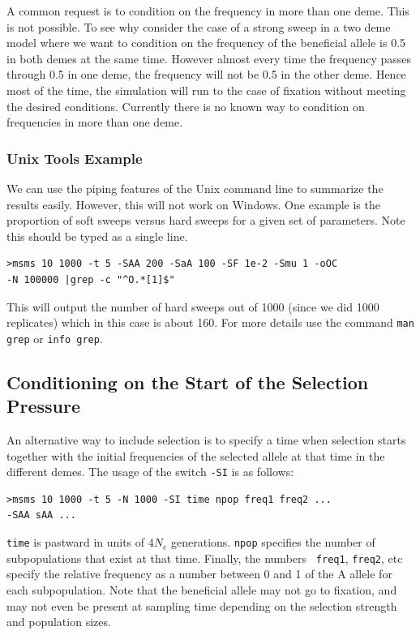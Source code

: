 \documentclass{article}
\begin{document}
A common request is to condition on the frequency in more than one deme. This is
not possible. To see why consider the case of a strong sweep in a two deme model
where we want to condition on the frequency of the beneficial allele is 0.5 in
both demes at the same time. However almost every time the frequency passes
through 0.5 in one deme, the frequency will not be 0.5 in the other deme. Hence
most of the time, the simulation will run to the case of fixation without
meeting the desired conditions. Currently there is no known way to condition on
frequencies in more than one deme. 

\subsubsection{Unix Tools Example}
We can use the piping features of the Unix command line to summarize the results
easily. However, this will not work on Windows. One example is the proportion of
soft sweeps versus hard sweeps for a given set of parameters. Note
this should be typed as a single line.
\begin{verbatim}
>msms 10 1000 -t 5 -SAA 200 -SaA 100 -SF 1e-2 -Smu 1 -oOC 
-N 100000 |grep -c "^O.*[1]$"
\end{verbatim}
This will output the number of hard sweeps out of 1000 (since we did 1000
replicates) which in this case is about 160. For more details use the command
{\tt man grep} or {\tt info grep}.


\subsection{Conditioning on the Start of the Selection Pressure}
\label{noFix} 

An alternative way to include selection is to specify a time when selection
starts together with the initial frequencies of the selected allele at that time
in the different demes. The usage of the switch {\tt -SI} is as follows:
\begin{verbatim}
>msms 10 1000 -t 5 -N 1000 -SI time npop freq1 freq2 ... 
-SAA sAA ...
\end{verbatim}
{\tt time} is pastward in units of $4N_e$ generations. {\tt npop} specifies the
number of subpopulations that exist at that time. Finally, the numbers {\tt
freq1}, {\tt freq2}, etc specify the relative frequency as a number between 0 and
1 of the A allele for each subpopulation.  Note that the beneficial allele may
not go to fixation, and may not even be present at sampling time depending on the
selection strength and population sizes.
\end{document}
